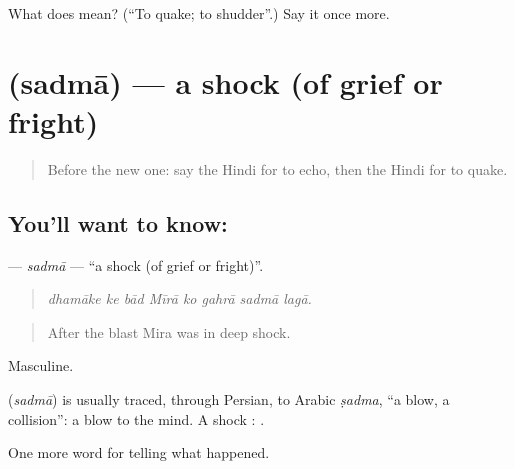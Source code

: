 \begin{tcolorbox}[breakable,colback=teal!4,colframe=teal!35!black,title={Before you move on}]
What does  mean? (\textquotedblleft{}To quake; to shudder\textquotedblright{}.) Say it once more.
\end{tcolorbox}
\section[\texorpdfstring{\hi{सदमा} (sadmā)}{सदमा (sadmā)}]{ (sadmā) — a shock (of grief or fright)}

\label{lesson:HI-C318-sadma}



\begin{quote}
Before the new one: say the Hindi for to echo, then the Hindi for to quake.
\end{quote}

\subsection*{You'll want to know: }
\textbf{} — \emph{sadmā} — \textquotedblleft{}a shock (of grief or fright)\textquotedblright{}.

\begin{quote}
       
\end{quote}

\begin{quote}
\emph{dhamāke ke bād Mīrā ko gahrā sadmā lagā.}
\end{quote}

\begin{quote}
After the blast Mira was in deep shock.
\end{quote}

Masculine.

\begin{cousinweb}
\textbf{} (\emph{sadmā}) is usually traced, through Persian, to Arabic \emph{ṣadma}, \textquotedblleft{}a blow, a collision\textquotedblright{}: a blow to the mind. A shock \textbf{ }: \textbf{   }.
\end{cousinweb}

\begin{grammarlens}[title={What you've built}]
One more word for telling what happened.
\end{grammarlens}

